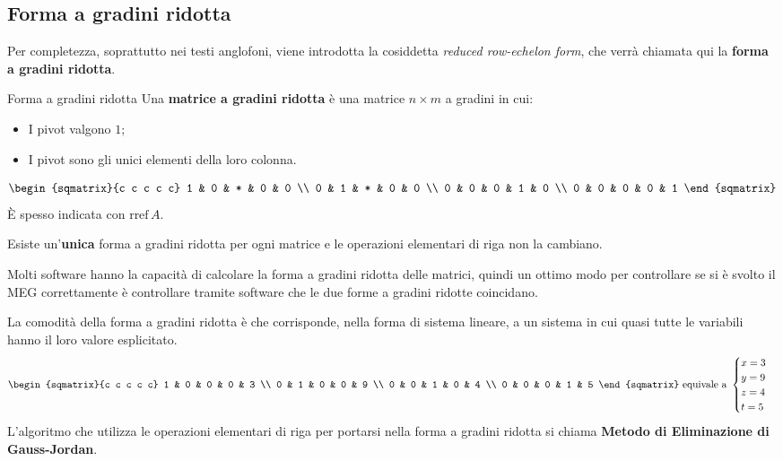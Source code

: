 \subsection{Forma a gradini ridotta}
Per completezza, soprattutto nei testi anglofoni, viene introdotta la cosiddetta \textit{reduced row-echelon form}, che verrà chiamata qui la \textbf{forma a gradini ridotta}.
\begin{newdef}{Forma a gradini ridotta}
    Una \textbf{matrice a gradini ridotta} è una matrice $n \times m$ a gradini in cui:
    \begin{itemize}
        \item I pivot valgono $1$;
        \item I pivot sono gli unici elementi della loro colonna.
    \end{itemize}
    \[
        \begin{sqmatrix}{c c c c c}
            1 & 0 & * & 0 & 0 \\
            0 & 1 & * & 0 & 0 \\
            0 & 0 & 0 & 1 & 0 \\
            0 & 0 & 0 & 0 & 1
        \end{sqmatrix}
    \]
    È spesso indicata con $\text{rref}\,A$.

    Esiste un'\textbf{unica} forma a gradini ridotta per ogni matrice e le operazioni elementari di riga non la cambiano.
\end{newdef}
\begin{nb}
    Molti software hanno la capacità di calcolare la forma a gradini ridotta delle matrici, quindi un ottimo modo per controllare se si è svolto il MEG correttamente è controllare tramite software che le due forme a gradini ridotte coincidano.
\end{nb}
La comodità della forma a gradini ridotta è che corrisponde, nella forma di sistema lineare, a un sistema in cui quasi tutte le variabili hanno il loro valore esplicitato.
\[
    \begin{sqmatrix}{c c c c c}
        1 & 0 & 0 & 0 & 3 \\
        0 & 1 & 0 & 0 & 9 \\
        0 & 0 & 1 & 0 & 4 \\
        0 & 0 & 0 & 1 & 5
    \end{sqmatrix}
    \text{ equivale a }
    \begin{cases}
        x = 3 \\
        y = 9 \\
        z = 4 \\
        t = 5
    \end{cases}
\]
L'algoritmo che utilizza le operazioni elementari di riga per portarsi nella forma a gradini ridotta si chiama \textbf{Metodo di Eliminazione di Gauss-Jordan}.

